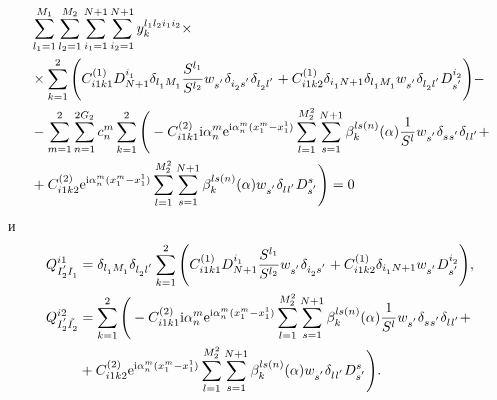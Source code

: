 \documentclass[press]{vestnik}
\begin{document}
\begin{equation*}
	\begin{split}
		&\sum_{l_{1}=1}^{M_{1}} \sum_{l_{2}=1}^{M_{2}} \sum_{i_{1}=1}^{N+1} \sum_{i_{2}=1}^{N+1} y_{k}^{l_{1}l_{2}i_{1}i_{2}} \times
		\\
		&\times \sum_{k=1}^{2} \Bigg( C_{i1k1}^{(1)} D_{N+1}^{i_{1}^{}} \delta_{l_{1}^{} M_{1}^{}} \frac{S^{l_{1}}}{S^{l_{2}}} w_{s^{'}}^{} \delta_{i_{2}^{} s_{}^{'}} \delta_{l_{2}^{} l_{}^{'}} + C_{i1k2}^{(1)} \delta_{i_{1}^{} N+1} \delta_{l_{1}^{} M_{1}^{}} w_{s^{'}}^{} \delta_{l_{2}^{} l_{}^{'}} D_{s^{'}}^{i_{2}^{}}	
		\Bigg) - 
		\\
		&- \sum_{m=1}^{2} \sum_{n=1}^{2G_{2}} c_{n}^{m} \sum_{k=1}^{2}
		\Bigg( -C_{i1k1}^{(2)} {\rm{i}} {\alpha_{n}^{m}} \mathrm{e}^{ {\rm{i}} {\alpha_{n}^{m}} (x_{1}^{m}-x_{1}^{1})} \sum_{l=1}^{M_{2}^{2}} \sum_{s=1}^{N+1} 		\beta_{k^{}}^{ls(n)}(\alpha) \frac{1}{S^{l}} w_{s^{'}}^{} \delta_{s_{}^{} s_{}^{'}} \delta_{l_{}^{} l_{}^{'}} +
		\\
		&+ C_{i1k2}^{(2)} \mathrm{e}^{ {\rm{i}} {\alpha_{n}^{m}} (x_{1}^{m}-x_{1}^{1})}  \sum_{l=1}^{M_{2}^{2}} \sum_{s=1}^{N+1} \beta_{k^{}}^{ls(n)}(\alpha) w_{s^{'}}^{} \delta_{l_{}^{} l_{}^{'}} D_{s_{}^{'}}^{s} 
		\Bigg) = 0
	\end{split}
\end{equation*}	
и
\begin{equation*}
	\begin{split}
		Q_{I_{2}^{'}I_{1}^{}}^{i1} &= \delta_{l_{1}^{} M_{1}^{}} \delta_{l_{2}^{} l_{}^{'}} \sum_{k=1}^{2} \Bigg(  C_{i1k1}^{(1)} D_{N+1}^{i_{1}^{}}  \frac{S^{l_{1}}}{S^{l_{2}}} w_{s^{'}}^{} \delta_{i_{2}^{} s_{}^{'}}  +  C_{i1k2}^{(1)} \delta_{i_{1}^{} N+1} w_{s^{'}}^{} D_{s^{'}}^{i_{2}^{}} \Bigg), \\
		Q_{I_{2}^{'}\tilde{I_{2}^{}}}^{i2} &= \sum_{k=1}^{2}
		\Bigg( -C_{i1k1}^{(2)} {\rm{i}} {\alpha_{n}^{m}} \mathrm{e}^{ {\rm{i}} {\alpha_{n}^{m}} (x_{1}^{m}-x_{1}^{1})} \sum_{l=1}^{M_{2}^{2}} \sum_{s=1}^{N+1} 		\beta_{k^{}}^{ls(n)}(\alpha) \frac{1}{S^{l}} w_{s^{'}}^{} \delta_{s_{}^{} s_{}^{'}} \delta_{l_{}^{} l_{}^{'}}  +
		\\
		&+ C_{i1k2}^{(2)} \mathrm{e}^{ {\rm{i}} {\alpha_{n}^{m}} (x_{1}^{m}-x_{1}^{1})} \sum_{l=1}^{M_{2}^{2}} \sum_{s=1}^{N+1} \beta_{k^{}}^{ls(n)}(\alpha) w_{s^{'}}^{} \delta_{l_{}^{} l_{}^{'}} D_{s_{}^{'}}^{s} 
		\Bigg).
	\end{split}
\end{equation*}
\end{document}
